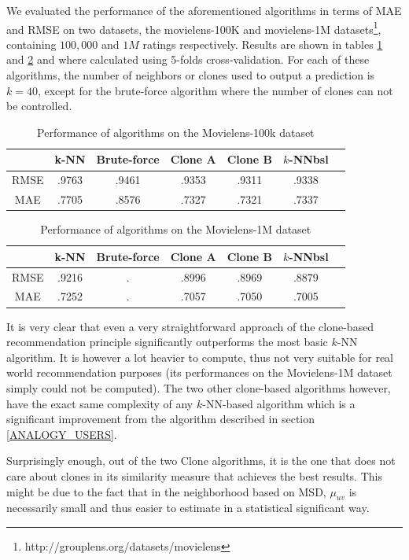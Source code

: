 We evaluated the performance of the aforementioned algorithms in terms of MAE
and RMSE on two datasets, the movielens-100K and movielens-1M
datasets\footnote{http://grouplens.org/datasets/movielens}, containing
$100,000$ and $1M$ ratings respectively. Results are shown in tables
\ref{table:res100k} and \ref{table:res1M} and where calculated using 5-folds
cross-validation. For each of these algorithms, the number of neighbors or
clones used to output a prediction is $k = 40$, except for the brute-force
algorithm where the number of clones can not be controlled.
\begin{table}[!ht]
\centering
\caption{Performance of algorithms on the Movielens-100k dataset}
\label{table:res100k}
\begin{tabular}{| c || c | c | c | c | c | c |}
\toprule
     &  k-NN & Brute-force & Clone A & Clone B & $k$-NNbsl\\
\midrule
RMSE & .9763 &   .9461    &   .9353 &  .9311  &  .9338   \\
MAE  & .7705 &   .8576    &   .7327 &  .7321  &  .7337   \\
\bottomrule
\end{tabular}
\end{table}

\begin{table}[!ht]
\centering
\caption{Performance of algorithms on the Movielens-1M dataset}
\label{table:res1M}
\begin{tabular}{| c || c | c | c | c | c | c |}
  \toprule
     &  k-NN & Brute-force & Clone A & Clone B & $k$-NNbsl\\
  \midrule
RMSE & .9216 &           .&   .8996 &  .8969  &  .8879\\
MAE  & .7252 &           .&   .7057 &  .7050  &  .7005\\
\bottomrule
\end{tabular}
\end{table}

It is very clear that even a very straightforward approach of the clone-based
recommendation principle significantly outperforms the most basic $k$-NN
algorithm. It is however a lot heavier to compute, thus not very suitable for
real world recommendation purposes (its performances on the Movielens-1M
dataset simply could not be computed). The two other clone-based algorithms
however, have the exact same complexity of any $k$-NN-based algorithm which is
a significant improvement from the algorithm described in section
\ref{ANALOGY_USERS}.

Surprisingly enough, out of the two Clone algorithms, it is the one that does
not care about clones in its similarity measure that achieves the best results.
This might be due to the fact that in the neighborhood based on MSD, $\mu_{uv}$
is necessarily small and thus easier to estimate in a statistical significant
way.

